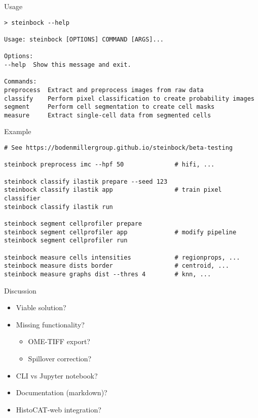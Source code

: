 \documentclass[[aspectratio=169]{beamer}
\begin{document}
\begin{frame}[fragile]{Usage}
	
\begin{verbatim}
> steinbock --help

Usage: steinbock [OPTIONS] COMMAND [ARGS]...

Options:
--help  Show this message and exit.

Commands:
preprocess  Extract and preprocess images from raw data
classify    Perform pixel classification to create probability images
segment     Perform cell segmentation to create cell masks
measure     Extract single-cell data from segmented cells
\end{verbatim}
	
\end{frame}


\begin{frame}[fragile]{Example}
	
\begin{verbatim}
# See https://bodenmillergroup.github.io/steinbock/beta-testing

steinbock preprocess imc --hpf 50              # hifi, ...

steinbock classify ilastik prepare --seed 123
steinbock classify ilastik app                 # train pixel classifier
steinbock classify ilastik run

steinbock segment cellprofiler prepare
steinbock segment cellprofiler app             # modify pipeline
steinbock segment cellprofiler run

steinbock measure cells intensities            # regionprops, ...
steinbock measure dists border                 # centroid, ...
steinbock measure graphs dist --thres 4        # knn, ...

\end{verbatim}
	
\end{frame}


\begin{frame}{Discussion}
	
	\begin{itemize}
		\item Viable solution?
		\item Missing functionality?
		\begin{itemize}
			\item OME-TIFF export?
			\item Spillover correction?
		\end{itemize}
		\item CLI vs Jupyter notebook?
		\item Documentation (markdown)?
		\item HistoCAT-web integration?
	\end{itemize}
	
\end{frame}
\end{document}
